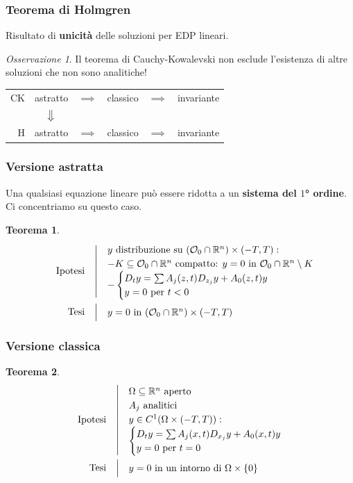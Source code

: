 \documentclass[serif,notheorems]{beamer}
\makeatletter
\newenvironment{ipotesi}%
{\quad\left|\quad\def\arraystretch{1.2}\begin{array}{@{}l@{}}}%
{\end{array}\right.}
\newcommand{\hpth}[2]
{
\begin{align*}
\quad
\text{Ipotesi}
&\begin{ipotesi}
#1
\end{ipotesi}\\
\text{Tesi}
&\begin{ipotesi}
#2
\end{ipotesi}
\end{align*}
}
\theoremstyle{definition} %
\newtheorem{theorem}{Teorema}[section] %
\theoremstyle{remark}
\newtheorem*{remark}{Osservazione}
\makeatother
\begin{document}
\begin{frame}
\frametitle{Teorema di Holmgren}
Risultato di \textbf{unicità} delle soluzioni per EDP lineari.
\begin{remark}
Il teorema di Cauchy-Kowalevski non esclude l'esistenza di altre soluzioni che non sono analitiche!
\end{remark}
\end{frame}

\begin{frame}
\begin{table}
\renewcommand{\arraystretch}{1.5}
\begin{tabular}{r||ccccc} 
CK & astratto & $\implies$  & classico & $\implies$ & invariante\\
&$\big\Downarrow$ &&&&\\
H & astratto & $\implies$ & classico & $\implies$ & invariante\\
\end{tabular}
\end{table}
\end{frame}

\begin{frame}
\frametitle{Versione astratta}
Una qualsiasi equazione lineare può essere ridotta a un \textbf{sistema del $1$° ordine}. Ci concentriamo su questo caso. 
\begin{theorem}
\hpth{
y \text{ distribuzione su } (\mathcal{O}_0 \cap \mathbb{R}^n) \times (-T,T):\\
- K\subseteq  \mathcal{O}_0 \cap \mathbb{R}^n \text{ compatto: } y=0  \text{ in } \mathcal{O}_0 \cap \mathbb{R}^n \setminus K\\
- \begin{cases}
D_t y = \sum A_j (z,t) D_{z_j}y+A_0(z,t)y \\
y=0 \text{ per } t<0
\end{cases}\\
}{
y = 0 \text{ in } (\mathcal{O}_0 \cap \mathbb{R}^n) \times (-T,T) \\
}
\end{theorem}
\end{frame}

\begin{frame}
\frametitle{Versione classica}
\begin{theorem}
\hpth{
\Omega \subseteq \mathbb{R}^n \text{ aperto}\\
A_j \text{ analitici}\\
y\in C^1 (\Omega \times (-T,T)): \\ 
\begin{cases}
D_t y = \sum A_j (x,t) D_{x_j}y+A_0(x,t)y \\
y=0 \text{ per } t=0
\end{cases} \\
}{
y = 0 \text{ in un intorno di } \Omega \times \{ 0\}
}
\end{theorem}
\end{frame}
\end{document}

